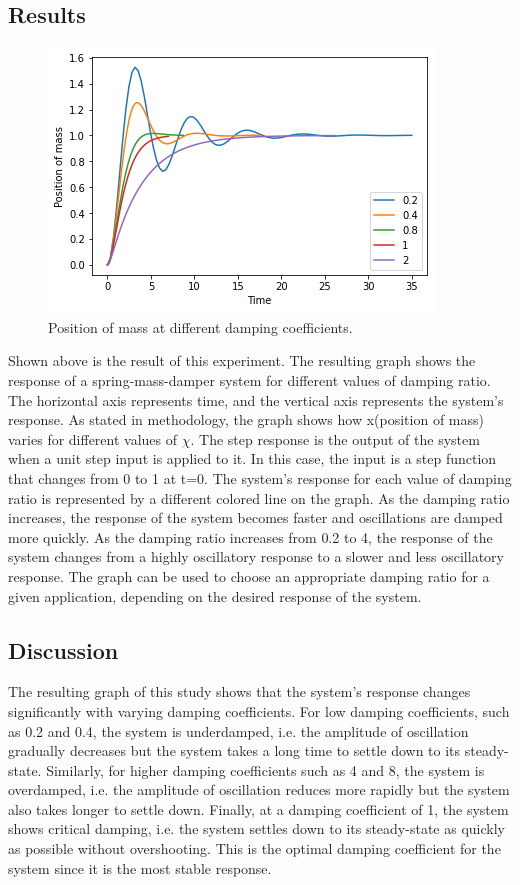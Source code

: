 \documentclass[10pt,journal,cspaper,compsoc]{IEEEtran}
\begin{document}
 \subsection{Results}
 \begin{figure}[h!]
  \centering
  \includegraphics[scale= 0.5]{images/Exp4.png}
  \caption{Position of mass at different damping coefficients.}
 \end{figure}
 Shown above is the result of this experiment.
 The resulting graph shows the response of a spring-mass-damper system for different values of damping ratio. 
 The horizontal axis represents time, and the vertical axis represents the system's response.
 As stated in methodology, the graph shows how x(position of mass) varies for different values of $\chi$.
 The step response is the output of the system when a unit step input is applied to it. In this case, the input is a step function that changes from 0 to 1 at t=0.
 The system's response for each value of damping ratio is represented by a different colored line on the graph. 
 As the damping ratio increases, the response of the system becomes faster and oscillations are damped more quickly.
 As the damping ratio increases from 0.2 to 4, the response of the system changes from a highly oscillatory response to a slower and less oscillatory response.
 The graph can be used to choose an appropriate damping ratio for a given application, depending on the desired response of the system.
\subsection{Discussion}
The resulting graph of this study shows that the system's response changes significantly with varying damping coefficients.
For low damping coefficients, such as 0.2 and 0.4, the system is underdamped, i.e. the amplitude of oscillation gradually decreases but the system takes a long time to settle down to its steady-state. 
Similarly, for higher damping coefficients such as 4 and 8, the system is overdamped, i.e. the amplitude of oscillation reduces more rapidly but the system also takes longer to settle down.
Finally, at a damping coefficient of 1, the system shows critical damping, i.e. the system settles down to its steady-state as quickly as possible without overshooting. 
This is the optimal damping coefficient for the system since it is the most stable response.
\end{document}

